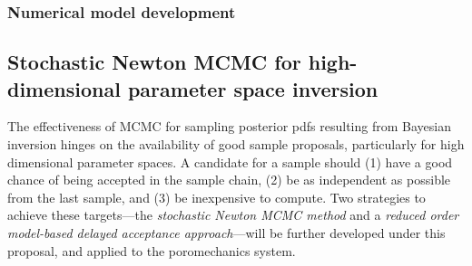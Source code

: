 \documentclass[11pt,final]{article}%
\begin{document}
\subsubsection{Numerical model development}\label{sec:num_darcy}

\subsection{Stochastic Newton MCMC for high-dimensional parameter
  space inversion} 
\label{sec:mcmc}


The effectiveness of MCMC for sampling posterior pdfs
resulting from Bayesian inversion hinges on the
availability of good sample proposals, particularly for high
dimensional parameter spaces. A candidate for a sample should (1) have
a good chance of being accepted in the sample chain, (2) be as
independent as possible from the last sample,
and (3) be inexpensive to compute. Two strategies to achieve these
targets---the {\em stochastic Newton MCMC method} and a {\em reduced
  order model-based delayed acceptance approach}---will be further
developed under this proposal, and applied to the poromechanics
system.
\end{document}
